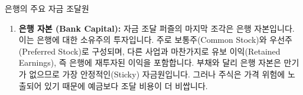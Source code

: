 \documentclass[11pt,a4paper]{article}
\begin{document}
\begin{summarybox}{은행의 주요 자금 조달원}
\begin{enumerate}
\begin{itemize}
        \textbf{레포의 문제점:} 레포와 다른 단기 차입 자금은 투자자들이 걱정하기 시작하면 사라지는 경향이 있습니다. 2007년 공황은 레포 시장의 뱅크 런이었다고 유명하게 관찰되었습니다. 미상환 레포의 규모가 거의 하룻밤 사이에 붕괴되었고, 일부 은행들은 정말 중요한 자금원을 잃었습니다. 리먼 브라더스(Lehman Brothers)가 대표적인 예입니다.
    \end{itemize}

    \item \textbf{은행 자본 (Bank Capital):}
    자금 조달 퍼즐의 마지막 조각은 은행 자본입니다. 이는 은행에 대한 소유주의 투자입니다. 주로 보통주(Common Stock)와 우선주(Preferred Stock)로 구성되며, 다른 사업과 마찬가지로 유보 이익(Retained Earnings), 즉 은행에 재투자된 이익을 포함합니다. 부채와 달리 은행 자본은 만기가 없으므로 가장 안정적인(Sticky) 자금원입니다. 그러나 주식은 가격 위험에 노출되어 있기 때문에 예금보다 조달 비용이 더 비쌉니다.
\end{enumerate}
\end{summarybox}
\end{document}
